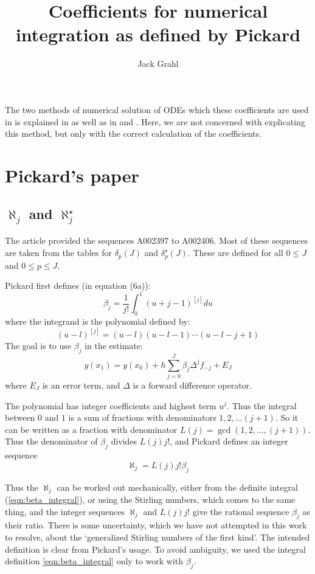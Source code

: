 \documentclass{article}
\title{Coefficients for numerical integration as defined by Pickard}
\author{Jack Grahl}
\begin{document}
\maketitle
{}

The two methods of numerical solution of ODEs which these coefficients are used in is explained in \cite{pickard} as well as in \cite{collatz} and \cite{henrici}.
Here, we are not concerned with explicating this method, but only with the correct calculation of the coefficients.
\section{Pickard's paper}
\subsection{$\aleph_j$ and $\aleph^{\star}_j$}
The article \cite{pickard} provided the sequences A002397 to A002406. Most of these sequences are taken from the tables for $\delta_p(J)$ and $\delta^{\star}_p(J)$. These are defined for all $0 \leq J$ and $0 \leq p \leq J$.

Pickard first defines (in equation (6a)):
\begin{equation}\label{eqn:beta_integral}
 \beta_j = \frac{1}{j!}\int_0^1 (u + j - 1)^{[j]} du 
\end{equation}
where the integrand is the polynomial defined by:
\[ (u - l)^{[j]} = (u - l)(u - l - 1)\cdots(u - l - j + 1) \]
The goal is to use $\beta_j$ in the estimate:
\[ y(x_1) = y(x_0) + h\sum_{j=0}^{J} \beta_j \Delta^{j}f_{-j} + E_{J} \]
where $E_J$ is an error term, and $\Delta$ is a forward difference operator.

The polynomial has integer coefficients and highest term $u^{j}$.
Thus the integral between $0$ and $1$ is a sum of fractions with denominators $1, 2, \ldots (j+1)$.
So it can be written as a fraction with denominator $L(j) = \gcd(1, 2, \ldots, (j+1))$.
Thus the denominator of $\beta_j$ divides $L(j)j!$, and Pickard defines an integer sequence
\begin{equation}\label{eqn:aleph}
 \aleph_j = L(j)j!\beta_j 
\end{equation}

Thus the $\aleph_j$ can be worked out mechanically, either from the definite integral (\ref{eqn:beta_integral}), or using the Stirling numbers, which comes to the same thing, and the integer sequences $\aleph_j$ and $L(j)j!$ give the rational sequence $\beta_j$ as their ratio.
There is some uncertainty, which we have not attempted in this work to resolve, about the `generalized Stirling numbers of the first kind'. The intended definition is clear from Pickard's usage. To avoid ambiguity, we used the integral definition \ref{eqn:beta_integral} only to work with $\beta_j$.
\end{document}
